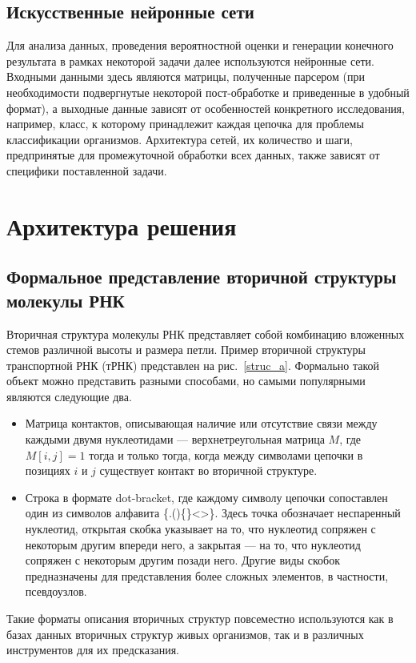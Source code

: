 \documentclass[14pt]{matmex-diploma-custom}
\begin{document}
\subsection{Искусственные нейронные сети}
Для анализа данных, проведения вероятностной оценки и генерации конечного результата в рамках некоторой задачи далее используются нейронные сети. Входными данными здесь являются матрицы, полученные парсером (при необходимости подвергнутые некоторой пост-обработке и приведенные в удобный формат), а выходные данные зависят от особенностей конкретного исследования, например, класс, к которому принадлежит каждая цепочка для проблемы классификации организмов. Архитектура сетей, их количество и шаги, предпринятые для промежуточной обработки всех данных, также зависят от специфики поставленной задачи.

\section{Архитектура решения}
\subsection{Формальное представление вторичной структуры молекулы РНК}
Вторичная структура молекулы РНК представляет собой комбинацию вложенных стемов различной высоты и размера петли. Пример вторичной структуры транспортной РНК (тРНК) представлен на рис.~\ref{struc_a}. Формально такой объект можно представить разными способами, но самыми популярными являются следующие два.
\begin{itemize}
    \item Матрица контактов, описывающая наличие или отсутствие связи между каждыми двумя нуклеотидами --- верхнетреугольная матрица $M$, где $M[i,j]=1$ тогда и только тогда, когда между символами цепочки в позициях $i$ и $j$ существует контакт во вторичной структуре.
    \item Строка в формате dot-bracket, где каждому символу цепочки сопоставлен один из символов алфавита \{.()\{\}<>\}. Здесь точка обозначает неспаренный нуклеотид, открытая скобка указывает на то, что нуклеотид сопряжен с некоторым другим впереди него, а закрытая --- на то, что нуклеотид сопряжен с некоторым другим позади него. Другие виды скобок предназначены для представления более сложных элементов, в частности, псевдоузлов.
\end{itemize}

Такие форматы описания вторичных структур повсеместно используются как в базах данных вторичных структур живых организмов, так и в различных инструментов для их предсказания.
\end{document}
